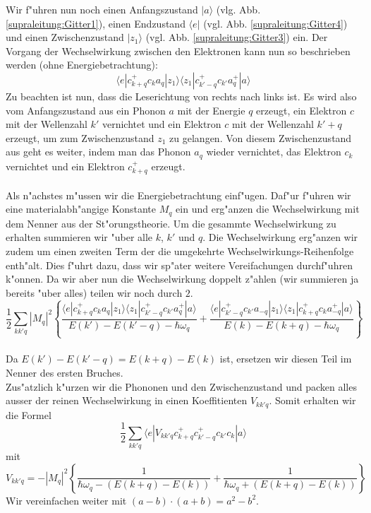 \begin{refsection}
Wir f"uhren nun noch einen Anfangszustand $|a\rangle$ (vlg. Abb. \ref{supraleitung:Gitter1}), einen Endzustand $\langle e|$ (vgl. Abb. \ref{supraleitung:Gitter4}) und einen Zwischenzustand $|z_1\rangle$ (vgl. Abb. \ref{supraleitung:Gitter3}) ein. Der Vorgang der Wechselwirkung zwischen den Elektronen kann nun so beschrieben werden (ohne Energiebetrachtung):
\begin{equation}
\langle e|c^+_{k+q} c_k a_q |z_1\rangle\langle z_1| c^+_{k'-q} c_{k'} a^+_q |a\rangle
\label{supraleitung:WechelwirkungOE}
\end{equation}
Zu beachten ist nun, dass die Leserichtung von rechts nach links ist. Es wird also vom Anfangszustand aus ein Phonon $a$ mit der Energie $q$ erzeugt, ein Elektron $c$ mit der Wellenzahl $k'$ vernichtet und ein Elektron $c$ mit der Wellenzahl $k'+q$ erzeugt, um zum Zwischenzustand $z_1$ zu gelangen.
Von diesem Zwischenzustand aus geht es weiter, indem man das Phonon $a_q$ wieder vernichtet, das Elektron $c_k$ vernichtet und ein Elektron $c^+_{k+q}$ erzeugt.
\\
\\
Als n"achstes m"ussen wir die Energiebetrachtung einf"ugen. Daf"ur f"uhren wir eine materialabh"angige Konstante $M_q$ ein und erg"anzen die Wechselwirkung mit dem Nenner aus der St"orungstheorie.
Um die gesammte Wechselwirkung zu erhalten summieren wir "uber alle $k$, $k'$ und $q$. Die Wechselwirkung erg"anzen wir zudem um einen zweiten Term der die umgekehrte Wechselwirkungs-Reihenfolge enth"alt. Dies f"uhrt dazu, dass wir sp"ater weitere Vereifachungen durchf"uhren k"onnen. Da wir aber nun die Wechselwirkung doppelt z"ahlen (wir summieren ja bereits "uber alles) teilen wir noch durch $2$.
\\
\begin{equation}
\frac{1}{2}
\sum \limits_{kk'q} |M_q|^2
\left\{
\frac
{\langle e|c^+_{k+q} c_k a_q |z_1\rangle\langle z_1| c^+_{k'-q} c_{k'} a^+_q |a\rangle }
{E(k')-E(k'-q)-\hbar\omega_q}
+
\frac
{\langle e|c^+_{k'-q} c_{k'} a_{-q}|z_1\rangle\langle z_1| c^+_{k+q} c_k a^+_{-q} |a\rangle }
{E(k)-E(k+q)-\hbar\omega_q}
\right\}
\label{supraleitung:WechelwirkungME}
\end{equation}
\\
Da $E(k')-E(k'-q) = E(k+q)-E(k)$ ist, ersetzen wir diesen Teil im Nenner des ersten Bruches.
\\
Zus"atzlich k"urzen wir die Phononen und den Zwischenzustand und packen alles ausser der reinen Wechselwirkung in einen Koeffitienten $V_{kk'q}$. Somit erhalten wir die Formel
\begin{equation}
\frac{1}{2}
\sum \limits_{kk'q} 
\langle e|V_{kk'q}c^+_{k+q}c^+_{k'-q}c_{k'}c_k|a \rangle
\label{supraleitung:WechelwirkungKurz}
\end{equation}
mit
\begin{equation}
V_{kk'q} = - |M_q|^2 \left\{
\frac{1}{\hbar\omega_q-(E(k+q)-E(k))}
+
\frac{1}{\hbar\omega_q+(E(k+q)-E(k))}
\right\}
\label{supraleitung:WechelwirkungVkk'q}
\end{equation}
Wir vereinfachen weiter mit $(a-b)\cdot (a+b) = a^2-b^2$.


\end{refsection}
